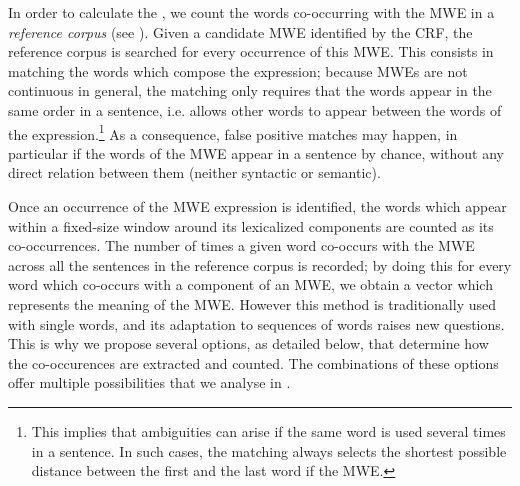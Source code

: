 \documentclass[output=paper,modfonts,nonflat]{langsci/langscibook}
\begin{document}
In order to calculate the , we count the words
co-occurring with the MWE in a {\em reference corpus} (see
). Given a candidate MWE identified by the CRF,
the reference corpus is searched for every occurrence of this
MWE. This consists in matching the words which compose the expression;
because MWEs are not continuous in general, the matching only requires
that the words appear in the same order in a sentence, i.e. allows
other words to appear between the words of the
expression.\footnote{This implies that ambiguities can arise if the
  same word is used several times in a sentence. In such cases, the
  matching always selects the shortest possible distance between the
  first and the last word if the MWE.}  As a consequence, false
positive matches may happen, in particular if the words of the MWE
appear in a sentence by chance, without any direct relation between
them (neither syntactic or semantic).

Once an occurrence of the MWE expression is identified, the words
which appear within a fixed-size window around its lexicalized
components are counted as its co-occurrences. The number of times a
given word co-occurs with the MWE across all the sentences in the
reference corpus is recorded; by doing this for every word which
co-occurs with a component of an MWE, we obtain a vector which
represents the meaning of the MWE. However this
method is traditionally used with single words, and its adaptation to
sequences of words raises new questions. This is why we propose
several options, as detailed below, that determine how the
co-occurences are extracted and counted. The combinations of these
options offer multiple possibilities that we analyse in
.
\end{document}
